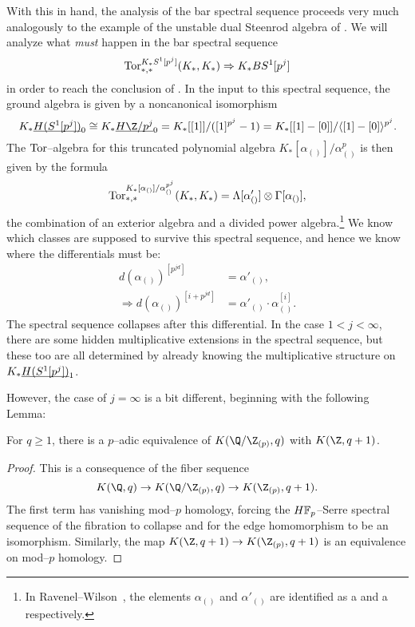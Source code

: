 With this in hand, the analysis of the bar spectral sequence proceeds very much analogously to the example of the unstable dual Steenrod algebra of .  We will analyze what \emph{must} happen in the bar spectral sequence \[\operatorname{Tor}^{K_* S^1[p^j]}_{*, *}(K_*, K_*) \Rightarrow K_* BS^1[p^j]\] in order to reach the conclusion of .  In the input to this spectral sequence, the ground algebra is given by a noncanonical isomorphism \[K_* \OS{H(S^1[p^j])}{0} \cong K_* \OS{H\Z/p^j}{0} = K_*[[1]] / ([1]^{p^j} - 1) = K_*[[1] - [0]] / \<[1] - [0]\>^{p^j}.\]  The \(\operatorname{Tor}\)--algebra for this truncated polynomial algebra \(K_*[\alpha_{()}] / \alpha_{()}^{p}\) is then given by the formula \[\operatorname{Tor}^{K_*[\alpha_{()}] / \alpha_{()}^{p^j}}_{*, *}(K_*, K_*) = \Lambda[\alpha'_{()}] \otimes \Gamma[\alpha_{()}],\] the combination of an exterior algebra and a divided power algebra.\footnote{In Ravenel--Wilson~\cite[Lemma 6.6]{RavenelWilsonKthyOfEMSpaces}, the elements \(\alpha_{()}\) and \(\alpha'_{()}\) are identified as a  and a  respectively.}  We know which classes are supposed to survive this spectral sequence, and hence we know where the differentials must be:
\begin{align*}
d(\alpha_{()})^{[p^{jd}]} & = \alpha'_{()}, \\
\Rightarrow d(\alpha_{()})^{[i + p^{jd}]} & = \alpha'_{()} \cdot \alpha_{()}^{[i]}.
\end{align*}
The spectral sequence collapses after this differential.  In the case \(1 < j < \infty\), there are some hidden multiplicative extensions in the spectral sequence, but these too are all determined by already knowing the multiplicative structure on \(K_* \underline{\smash{H(S^1[p^j])}}_{1}\).

However, the case of \(j = \infty\) is a bit different, beginning with the following Lemma:

\begin{lemma}
For \(q \ge 1\), there is a \(p\)--adic equivalence of \(K(\Q/\Z_{(p)}, q)\) with \(K(\Z, q+1)\).
\end{lemma}
\begin{proof}
This is a consequence of the fiber sequence \[K(\Q, q) \to K(\Q/\Z_{(p)}, q) \to K(\Z_{(p)}, q+1).\]  The first term has vanishing mod--\(p\) homology, forcing the \(\HFp\)--Serre spectral sequence of the fibration to collapse and for the edge homomorphism to be an isomorphism.  Similarly, the map \(K(\Z, q+1) \to K(\Z_{(p)}, q+1)\) is an equivalence on mod--\(p\) homology.
\end{proof}

